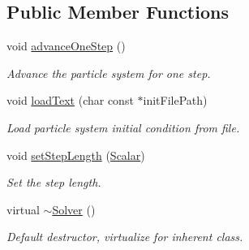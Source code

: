 \subsection*{Public Member Functions}
\begin{DoxyCompactItemize}
\item 
void \mbox{\hyperlink{class_space_h_1_1_solver_a28a4fd8cbf6df0d2bd1e3d376275f57e}{advance\+One\+Step}} ()
\begin{DoxyCompactList}\small\item\em Advance the particle system for one step. \end{DoxyCompactList}\item 
void \mbox{\hyperlink{class_space_h_1_1_solver_aca3536accc3ff7f048f546992984d92a}{load\+Text}} (char const $\ast$init\+File\+Path)
\begin{DoxyCompactList}\small\item\em Load particle system initial condition from file. \end{DoxyCompactList}\item 
void \mbox{\hyperlink{class_space_h_1_1_solver_ad52921ef312d63c82adf7f2fb98205aa}{set\+Step\+Length}} (\mbox{\hyperlink{class_space_h_1_1_solver_aa0ade682bd07e13fef77e7dcbeb6b46a}{Scalar}})
\begin{DoxyCompactList}\small\item\em Set the step length. \end{DoxyCompactList}\item 
virtual \mbox{\hyperlink{class_space_h_1_1_solver_ab2d2219ff8d7882b91e20daba262a0f1}{$\sim$\+Solver}} ()
\begin{DoxyCompactList}\small\item\em Default destructor, virtualize for inherent class. \end{DoxyCompactList}\end{DoxyCompactItemize}
